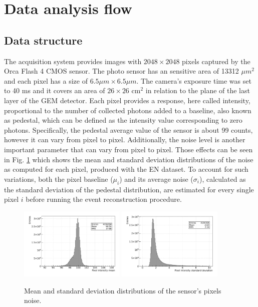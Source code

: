 \documentclass[a4paper,11pt]{article}
\begin{document}
\section{Data analysis flow}
\label{sec:daq}

\subsection{Data structure}

The acquisition system provides images with $2048 \times 2048$ pixels captured by the Orca Flash 4 CMOS sensor. The photo sensor has an sensitive area of 13312 $\mu m^2$ and each pixel has a size of $6.5 \mu m \times 6.5 \mu m$.
The camera's exposure time was set to 40 ms and it covers an area of $26 \times 26$ cm$^2$ in relation to the plane of the last layer of the GEM detector. Each pixel provides a response, here called intensity, proportional to the number of collected photons \cite{bib:nim_orange1} added to a baseline, also known as pedestal, which can be defined as the intensity value corresponding to zero photons. Specifically, the pedestal average value of the sensor is about 99 counts, however it can vary from pixel to pixel.
Additionally, the noise level is another important parameter that can vary from pixel to pixel.
Those effects can be seen in Fig. \ref{fig:sensor_noise} which shows the mean and standard deviation distributions of the noise as computed for each pixel, produced with the EN dataset.
To account for such variations, both the pixel baseline ($\mu_i$) and its average noise ($\sigma_i$), calculated as the standard deviation of the pedestal distribution,  are estimated for every single pixel $i$ before running the event reconstruction procedure.



\begin{figure}[ht]
\centering
\includegraphics[width=0.45\textwidth]{Mean_2155.pdf}
\includegraphics[width=0.45\textwidth]{Std_2155.pdf}
\caption{Mean and standard deviation distributions of the sensor's pixels noise.}
\label{fig:sensor_noise}
\end{figure}
\end{document}
